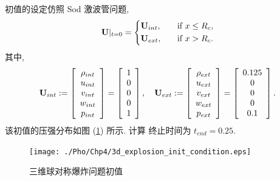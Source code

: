 初值的设定仿照 Sod 激波管问题,
\begin{equation}
  \label{eq:3d-spherical-symmetry-euler-initial}
  {\bf{U}}|_{t = 0} = \left\{
    \begin{aligned}
      &{\bf{U}}_{int}, & \quad & \mbox{if} ~ x\le R_{c},\\
      &{\bf{U}}_{ext}, & \quad & \mbox{if} ~ x > R_{c}.
    \end{aligned}
  \right.
\end{equation}
其中,
\begin{equation}
  \label{eq:3d-spherical-symmetry-euler-initial-notation}
  {\bf{U}}_{int} := \left[
    \begin{array}{c}
      \rho_{int}\\
      u_{int}\\
      v_{int}\\
      w_{int}\\
      p_{int}
    \end{array}
  \right] = \left[
    \begin{array}{c}
      1\\
      0\\
      0\\
      0\\
      1
    \end{array}
  \right], \quad
  {\bf{U}}_{ext} := \left[
    \begin{array}{c}
      \rho_{ext}\\
      u_{ext}\\
      v_{ext}\\
      w_{ext}\\
      p_{ext}
    \end{array}
  \right] = \left[
    \begin{array}{c}
      0.125\\
      0\\
      0\\
      0\\
      0.1
    \end{array}
  \right].
\end{equation}
该初值的压强分布如图 (\ref{fig:3d-explosion-initial}) 所示. 计算
终止时间为 $t_{end} = 0.25$.

\begin{figure}[htbp]
  \centering
  \texttt{[image: ./Pho/Chp4/3d\_explosion\_init\_condition.eps]}
  \caption{三维球对称爆炸问题初值}
  \label{fig:3d-explosion-initial}
\end{figure}

